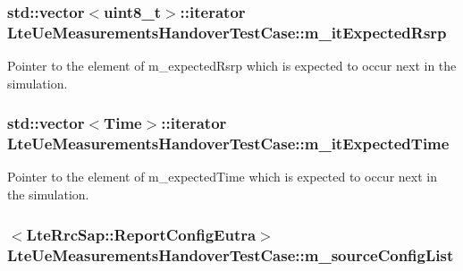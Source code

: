 \subsubsection[{\texorpdfstring{m\+\_\+it\+Expected\+Rsrp}{m_itExpectedRsrp}}]{\setlength{\rightskip}{0pt plus 5cm}std\+::vector$<$uint8\+\_\+t$>$\+::iterator Lte\+Ue\+Measurements\+Handover\+Test\+Case\+::m\+\_\+it\+Expected\+Rsrp\hspace{0.3cm}{\ttfamily [private]}}\hypertarget{classLteUeMeasurementsHandoverTestCase_a3536cc572e685490dd4e4fde364f39a3}{}\label{classLteUeMeasurementsHandoverTestCase_a3536cc572e685490dd4e4fde364f39a3}


Pointer to the element of {\ttfamily m\+\_\+expected\+Rsrp} which is expected to occur next in the simulation. 

\subsubsection[{\texorpdfstring{m\+\_\+it\+Expected\+Time}{m_itExpectedTime}}]{\setlength{\rightskip}{0pt plus 5cm}std\+::vector$<${\bf Time}$>$\+::iterator Lte\+Ue\+Measurements\+Handover\+Test\+Case\+::m\+\_\+it\+Expected\+Time\hspace{0.3cm}{\ttfamily [private]}}\hypertarget{classLteUeMeasurementsHandoverTestCase_a95dfbfd7799a6d05744eb034fc490bb3}{}\label{classLteUeMeasurementsHandoverTestCase_a95dfbfd7799a6d05744eb034fc490bb3}


Pointer to the element of {\ttfamily m\+\_\+expected\+Time} which is expected to occur next in the simulation. 

\subsubsection[{\texorpdfstring{m\+\_\+source\+Config\+List}{m_sourceConfigList}}]{$<${\bf Lte\+Rrc\+Sap\+::\+Report\+Config\+Eutra}$>$ Lte\+Ue\+Measurements\+Handover\+Test\+Case\+::m\+\_\+source\+Config\+List\hspace{0.3cm}{\ttfamily [private]}}\hypertarget{classLteUeMeasurementsHandoverTestCase_a49bb851aed531dfbf9a9e88284c4f0ef}{}\label{classLteUeMeasurementsHandoverTestCase_a49bb851aed531dfbf9a9e88284c4f0ef}


